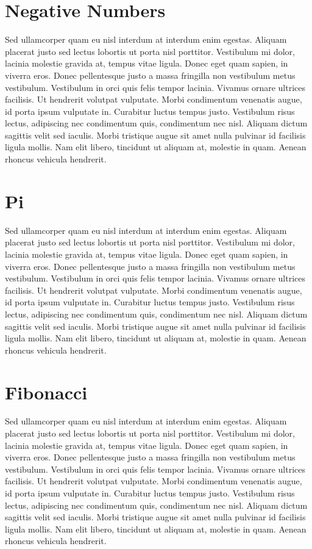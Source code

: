 \section{Negative Numbers}

Sed ullamcorper quam eu nisl interdum at interdum enim egestas. Aliquam placerat justo sed lectus lobortis ut porta nisl porttitor. Vestibulum mi dolor, lacinia molestie gravida at, tempus vitae ligula. Donec eget quam sapien, in viverra eros. Donec pellentesque justo a massa fringilla non vestibulum metus vestibulum. Vestibulum in orci quis felis tempor lacinia. Vivamus ornare ultrices facilisis. Ut hendrerit volutpat vulputate. Morbi condimentum venenatis augue, id porta ipsum vulputate in. Curabitur luctus tempus justo. Vestibulum risus lectus, adipiscing nec condimentum quis, condimentum nec nisl. Aliquam dictum sagittis velit sed iaculis. Morbi tristique augue sit amet nulla pulvinar id facilisis ligula mollis. Nam elit libero, tincidunt ut aliquam at, molestie in quam. Aenean rhoncus vehicula hendrerit.

\section{Pi}

Sed ullamcorper quam eu nisl interdum at interdum enim egestas. Aliquam placerat justo sed lectus lobortis ut porta nisl porttitor. Vestibulum mi dolor, lacinia molestie gravida at, tempus vitae ligula. Donec eget quam sapien, in viverra eros. Donec pellentesque justo a massa fringilla non vestibulum metus vestibulum. Vestibulum in orci quis felis tempor lacinia. Vivamus ornare ultrices facilisis. Ut hendrerit volutpat vulputate. Morbi condimentum venenatis augue, id porta ipsum vulputate in. Curabitur luctus tempus justo. Vestibulum risus lectus, adipiscing nec condimentum quis, condimentum nec nisl. Aliquam dictum sagittis velit sed iaculis. Morbi tristique augue sit amet nulla pulvinar id facilisis ligula mollis. Nam elit libero, tincidunt ut aliquam at, molestie in quam. Aenean rhoncus vehicula hendrerit.


\section{Fibonacci}

Sed ullamcorper quam eu nisl interdum at interdum enim egestas. Aliquam placerat justo sed lectus lobortis ut porta nisl porttitor. Vestibulum mi dolor, lacinia molestie gravida at, tempus vitae ligula. Donec eget quam sapien, in viverra eros. Donec pellentesque justo a massa fringilla non vestibulum metus vestibulum. Vestibulum in orci quis felis tempor lacinia. Vivamus ornare ultrices facilisis. Ut hendrerit volutpat vulputate. Morbi condimentum venenatis augue, id porta ipsum vulputate in. Curabitur luctus tempus justo. Vestibulum risus lectus, adipiscing nec condimentum quis, condimentum nec nisl. Aliquam dictum sagittis velit sed iaculis. Morbi tristique augue sit amet nulla pulvinar id facilisis ligula mollis. Nam elit libero, tincidunt ut aliquam at, molestie in quam. Aenean rhoncus vehicula hendrerit.

